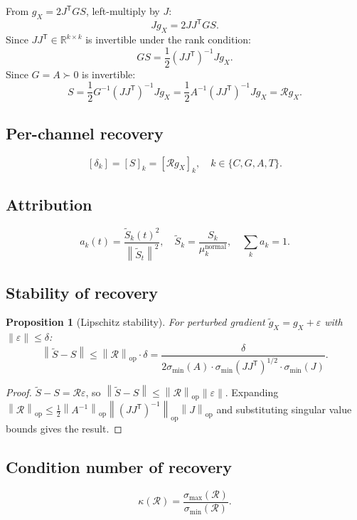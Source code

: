 \documentclass[11pt,a4paper]{article}
\newtheorem{proposition}[theorem]{Proposition}
\theoremstyle{definition}
\newcommand{\R}{\mathbb{R}}
\newcommand{\T}{^{\mathsf{T}}}
\newcommand{\norm}[1]{\left\|#1\right\|}
\newcommand{\gX}{g_X}
\begin{document}
From $\gX = 2J\T GS$, left-multiply by $J$:
\[
J\gX = 2JJ\T GS.
\]
Since $JJ\T \in \R^{k\times k}$ is invertible under the rank condition:
\[
GS = \frac{1}{2}(JJ\T)^{-1}J\gX.
\]
Since $G = A \succ 0$ is invertible:
\[
S = \frac{1}{2}G^{-1}(JJ\T)^{-1}J\gX = \frac{1}{2}A^{-1}(JJ\T)^{-1}J\gX = \mathcal{R}\gX.
\]

\subsection{Per-channel recovery}

\[
[\delta_k] = [S]_k = [\mathcal{R}\gX]_k, \quad k \in \{C,G,A,T\}.
\]

\subsection{Attribution}

\[
a_k(t) = \frac{\tilde S_k(t)^2}{\norm{\tilde S_t}^2}, \quad \tilde S_k = \frac{S_k}{\mu_k^\text{normal}}, \quad \sum_k a_k = 1.
\]

\subsection{Stability of recovery}

\begin{proposition}[Lipschitz stability]
For perturbed gradient $\tilde\gX = \gX + \varepsilon$ with $\norm{\varepsilon} \leq \delta$:
\[
\norm{\tilde S - S} \leq \norm{\mathcal{R}}_\mathrm{op}\cdot\delta = \frac{\delta}{2\sigma_{\min}(A)\cdot\sigma_{\min}(JJ\T)^{1/2}\cdot\sigma_{\min}(J)}.
\]
\end{proposition}

\begin{proof}
$\tilde S - S = \mathcal{R}\varepsilon$, so $\norm{\tilde S - S} \leq \norm{\mathcal{R}}_\mathrm{op}\norm{\varepsilon}$.
Expanding $\norm{\mathcal{R}}_\mathrm{op} \leq \frac{1}{2}\norm{A^{-1}}_\mathrm{op}\norm{(JJ\T)^{-1}}_\mathrm{op}\norm{J}_\mathrm{op}$
and substituting singular value bounds gives the result.
\end{proof}

\subsection{Condition number of recovery}

\[
\kappa(\mathcal{R}) = \frac{\sigma_{\max}(\mathcal{R})}{\sigma_{\min}(\mathcal{R})}.
\]
\end{document}
